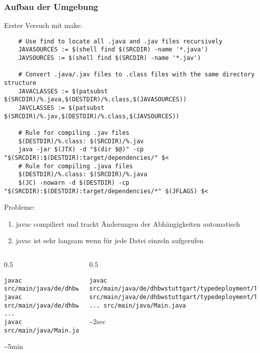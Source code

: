 \documentclass{beamer}
\begin{document}
\begin{frame}[fragile]
    \frametitle{Aufbau der Umgebung}
    Erster Versuch mit make:
    \begin{lstlisting}
    # Use find to locate all .java and .jav files recursively
    JAVASOURCES := $(shell find $(SRCDIR) -name '*.java')
    JAVSOURCES := $(shell find $(SRCDIR) -name '*.jav')

    # Convert .java/.jav files to .class files with the same directory structure
    JAVACLASSES := $(patsubst $(SRCDIR)/%.java,$(DESTDIR)/%.class,$(JAVASOURCES))
    JAVCLASSES := $(patsubst $(SRCDIR)/%.jav,$(DESTDIR)/%.class,$(JAVSOURCES))

    # Rule for compiling .jav files
    $(DESTDIR)/%.class: $(SRCDIR)/%.jav
    java -jar $(JTX) -d "$(dir $@)" -cp "$(SRCDIR):$(DESTDIR):target/dependencies/" $<
    # Rule for compiling .java files
    $(DESTDIR)/%.class: $(SRCDIR)/%.java
	$(JC) -nowarn -d $(DESTDIR) -cp "$(SRCDIR):$(DESTDIR):target/dependencies/*" $(JFLAGS) $<
\end{lstlisting}
\end{frame}


\begin{frame}[fragile]
    Probleme:
    \begin{enumerate}
        \item javac compiliert und trackt Änderungen der Abhängigkeiten automatisch
        \item javac ist sehr langsam wenn für jede Datei einzeln aufgerufen
    \end{enumerate}
    \begin{columns}
        \begin{column}{0.5\textwidth}
            \begin{lstlisting}
javac src/main/java/de/dhbwstuttgart/typedeployment/TypeInsert.java
javac src/main/java/de/dhbwstuttgart/typedeployment/TypeInsertPlacer.java
...
javac src/main/java/Main.java
                \end{lstlisting}
            \sim{}5min
        \end{column}
        \begin{column}{0.5\textwidth}
            \begin{lstlisting}
javac src/main/java/de/dhbwstuttgart/typedeployment/TypeInsert.java src/main/java/de/dhbwstuttgart/typedeployment/TypeInsertPlacer.java ... src/main/java/Main.java
                \end{lstlisting}
            \sim{}2sec
        \end{column}
    \end{columns}
\end{frame}
\end{document}
